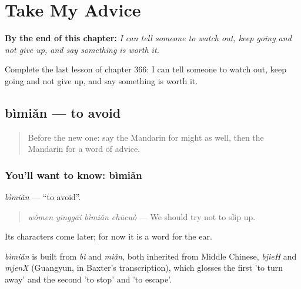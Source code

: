 
\chapter{Take My Advice}
\label{ch:zh-take-my-advice}

\begin{chapteropening}
\textbf{By the end of this chapter:} \emph{I can tell someone to watch out, keep going and not give up, and say something is worth it.}

Complete the last lesson of chapter 366: I can tell someone to watch out, keep going and not give up, and say something is worth it.
\end{chapteropening}

\section[bìmiǎn]{bìmiǎn — to avoid}

\label{lesson:ZH-C366-bimian}



\begin{quote}
Before the new one: say the Mandarin for might as well, then the Mandarin for a word of advice.
\end{quote}

\subsection*{You'll want to know: bìmiǎn}
\emph{bìmiǎn} — \textquotedblleft{}to avoid\textquotedblright{}.

\begin{quote}
\emph{wǒmen yīnggāi bìmiǎn chūcuò} — We should try not to slip up.
\end{quote}

Its characters come later; for now it is a word for the ear.

\begin{cousinweb}
\emph{bìmiǎn} is built from \emph{bì} and \emph{miǎn}, both inherited from Middle Chinese, \emph{bjieH} and \emph{mjenX} (Guangyun, in Baxter's transcription), which glosses the first 'to turn away' and the second 'to stop' and 'to escape'.
\end{cousinweb}

